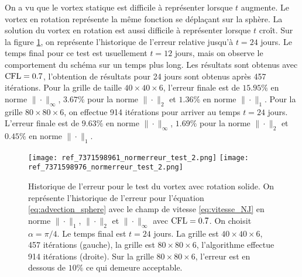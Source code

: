 On a vu que le vortex statique est difficile à représenter lorsque $t$ augmente. Le vortex en rotation représente la même fonction se déplaçant sur la sphère. La solution du vortex en rotation est aussi difficile à représenter lorsque $t$ croît. Sur la figure \ref{fig:NJ24jours}, on représente l'historique de l'erreur relative jusqu'à $t=24$ jours. Le temps final pour ce test est usuellement $t=12$ jours, mais on observe le comportement du schéma sur un temps plus long. Les résultats sont obtenus avec $\text{CFL} = 0.7$, l'obtention de résultats pour 24 jours sont obtenus après 457 itérations. Pour la grille de taille $40 \times 40 \times 6$, l'erreur finale est de $15.95\%$ en norme $\| \cdot \|_{\infty}$, $3.67\%$ pour la norme $\| \cdot \|_{2}$ et $1.36\%$ en norme $\| \cdot \|_{1}$. Pour la grille $80 \times 80 \times 6$, on effectue 914 itérations pour arriver au temps $t=24$ jours. L'erreur finale est de $9.63\%$ en norme $\| \cdot \|_{\infty}$, $1.69\%$ pour la norme $\| \cdot \|_{2}$ et $0.45\%$ en norme $\| \cdot \|_{1}$.

\begin{figure}[htbp]
\begin{center}
\texttt{[image: ref\_7371598961\_normerreur\_test\_2.png]}
\texttt{[image: ref\_7371598976\_normerreur\_test\_2.png]}
\end{center}
\caption{Historique de l'erreur pour le test du vortex avec rotation solide. On représente l'historique de l'erreur pour l'équation \eqref{eq:advection_sphere} avec le champ de vitesse \eqref{eq:vitesse_NJ} en norme $\| \cdot \|_1$, $\| \cdot \|_2$ et $\| \cdot \|_{\infty}$ avec $\text{CFL} = 0.7$. On choisit $\alpha = \pi/4$. Le temps final est $t=24$ jours. La grille est $40 \times 40  \times 6$, 457 itérations (gauche), la grille est $80 \times 80  \times 6$, l'algorithme effectue 914 itérations (droite). Sur la grille $80 \times 80 \times 6$, l'erreur est en dessous de $10 \%$ ce qui demeure acceptable.}
\label{fig:NJ24jours}
\end{figure} 

